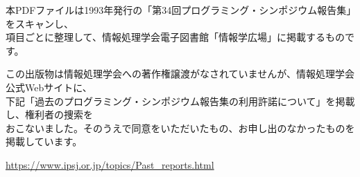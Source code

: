 \documentclass[b5j]{jsarticle}
\begin{document}
\begin{flushleft}

本PDFファイルは1993年発行の「第34回プログラミング・シンポジウム報告集」をスキャンし、\\項目ごとに整理して、情報処理学会電子図書館「情報学広場」に掲載するものです。

\medskip

この出版物は情報処理学会への著作権譲渡がなされていませんが、情報処理学会公式Webサイトに、\\下記「過去のプログラミング・シンポジウム報告集の利用許諾について」を掲載し、権利者の捜索を\\おこないました。そのうえで同意をいただいたもの、お申し出のなかったものを掲載しています。

\medskip

\url{https://www.ipsj.or.jp/topics/Past_reports.html}

\end{flushleft}

\bigskip
\end{document}
